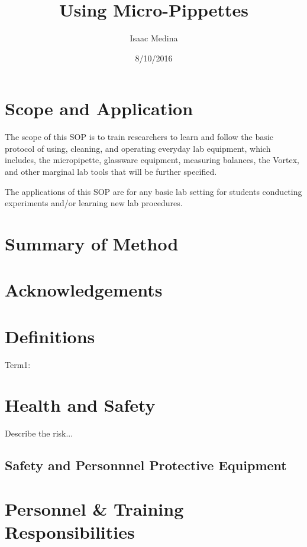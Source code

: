 \documentclass[12pt]{../SOP4_alpha}\usepackage[]{graphicx}\usepackage[]{xcolor}
\title{Using Micro-Pippettes}
\date{8/10/2016}
\author{Isaac Medina}
\begin{document}
\maketitle 


\section{Scope and Application}

\NP The scope of this SOP is  to train researchers to learn and follow the basic protocol of using, cleaning, and operating everyday lab equipment, which includes, the micropipette, glassware equipment, measuring balances, the Vortex, and other marginal lab tools that will be further specified. 

\NP The applications of this SOP are for any basic lab setting for students conducting experiments and/or learning new lab procedures.

\section{Summary of Method}

\NP 

\tableofcontents

\newpage

\section{Acknowledgements}

\section{Definitions}

\NP Term1:


\section{Health and Safety}

\NP Describe the risk...


\subsection*{Safety and Personnnel Protective Equipment}


\section{Personnel \& Training Responsibilities}
\end{document}
